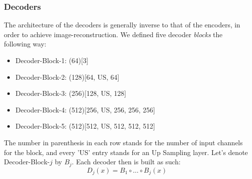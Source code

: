 \subsubsection{Decoders}\label{subsec:Decoders}
The architecture of the decoders is generally inverse to that of the encoders, in order to achieve image-reconstruction. We defined five decoder \textit{blocks} the following way:
\begin{itemize}
	\item Decoder-Block-1: (64)[3]
	\item Decoder-Block-2: (128)[64, US, 64]
	\item Decoder-Block-3: (256)[128, US, 128]
	\item Decoder-Block-4: (512)[256, US, 256, 256, 256]
	\item Decoder-Block-5: (512)[512, US, 512, 512, 512]
\end{itemize}
The number in parenthesis in each row stands for the number of input channels for the block, and every 'US' entry stands for an Up Sampling layer. Let's denote Decoder-Block-$j$ by $B_j$. Each decoder then is built as such:
\begin{equation}\label{eq:decoder}
D_j(x) = B_1 \circ \dots \circ B_j (x)
\end{equation}


